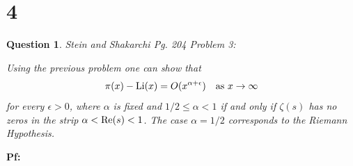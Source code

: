 \documentclass{article}
\newtheorem{question}{Question}
\begin{document}
\section*{4}
\begin{myBox}[]{}
    \begin{question}
        Stein and Shakarchi Pg. 204 Problem 3:

        Using the previous problem one can show that 
        $$\pi(x)-\textmd{Li}(x)=O(x^{\alpha+\epsilon})\quad \textmd{as }x\rightarrow\infty$$
        for every $\epsilon>0$, where $\alpha$ is fixed and $1/2\leq \alpha<1$ if and only if $\zeta(s)$ has no zeros in the strip $\alpha<\textmd{Re}(s)<1$. The case $\alpha=1/2$ corresponds to the Riemann Hypothesis.     
    \end{question}
\end{myBox}

\textbf{Pf:}
\end{document}
